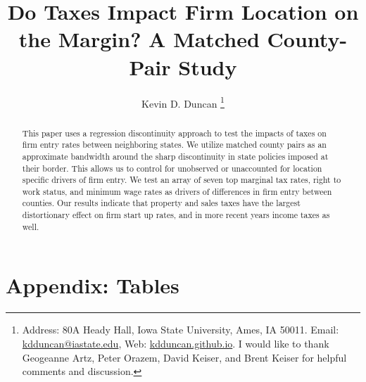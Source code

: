 \documentclass[12pt,a4paper]{article}
\renewcommand{\baselinestretch}{2}
\begin{document}
\title{Do Taxes Impact Firm Location on the Margin? A Matched County-Pair Study}
\author{Kevin D. Duncan \thanks{Address: 80A Heady Hall, Iowa State University, Ames, IA 50011. Email: \url{kdduncan@iastate.edu}, Web: \url{kdduncan.github.io}. I would like to thank Geogeanne Artz, Peter Orazem, David Keiser, and Brent Keiser for helpful comments and discussion.}}
\date{}
\maketitle

\begin{abstract}
This paper uses a regression discontinuity approach to test the impacts of taxes on firm entry rates between neighboring states. We utilize matched county pairs as an approximate bandwidth around the sharp discontinuity in state policies imposed at their border. This allows us to control for unobserved or unaccounted for location specific drivers of firm entry. We test an array of seven top marginal tax rates, right to work status, and minimum wage rates as drivers of differences in firm entry between counties. Our results indicate that property and sales taxes have the largest distortionary effect on firm start up rates, and in more recent years income taxes as well.
\end{abstract}







\renewcommand{\baselinestretch}{1} 

\section{Appendix: Tables}

\begin{landscape}

\end{landscape}
\restoregeometry

\begin{landscape}

\end{landscape}
\restoregeometry



\begin{landscape}

\end{landscape}
\restoregeometry
\end{document}
